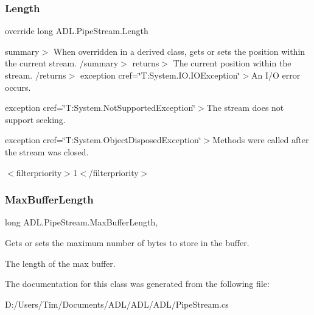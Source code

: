 \subsubsection{\texorpdfstring{Length}{Length}}
{\footnotesize\ttfamily override long A\+D\+L.\+Pipe\+Stream.\+Length\hspace{0.3cm}{\ttfamily [get]}}

summary$>$ When overridden in a derived class, gets or sets the position within the current stream. /summary$>$ returns$>$ The current position within the stream. /returns$>$ exception cref=\char`\"{}\+T\+:\+System.\+I\+O.\+I\+O\+Exception\char`\"{}$>$An I/O error occurs. 

exception cref=\char`\"{}\+T\+:\+System.\+Not\+Supported\+Exception\char`\"{}$>$The stream does not support seeking. 

exception cref=\char`\"{}\+T\+:\+System.\+Object\+Disposed\+Exception\char`\"{}$>$Methods were called after the stream was closed. 

$<$filterpriority$>$1$<$/filterpriority$>$ \mbox{\label{class_a_d_l_1_1_pipe_stream_a250f42c7da667f60487068e27c3d67d0}} 
\subsubsection{\texorpdfstring{Max\+Buffer\+Length}{MaxBufferLength}}
{\footnotesize\ttfamily long A\+D\+L.\+Pipe\+Stream.\+Max\+Buffer\+Length\hspace{0.3cm}{\ttfamily [get]}, {\ttfamily [set]}}



Gets or sets the maximum number of bytes to store in the buffer. 

The length of the max buffer.

The documentation for this class was generated from the following file\+:\begin{DoxyCompactItemize}
\item 
D\+:/\+Users/\+Tim/\+Documents/\+A\+D\+L/\+A\+D\+L/\+A\+D\+L/Pipe\+Stream.\+cs\end{DoxyCompactItemize}
